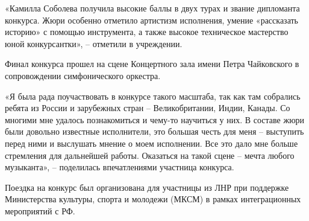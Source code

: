 «Камилла Соболева получила высокие баллы в двух турах и звание дипломанта
конкурса. Жюри особенно отметило артистизм исполнения, умение «рассказать
историю» с помощью инструмента, а также высокое техническое мастерство юной
конкурсантки», – отметили в учреждении. 

Финал конкурса прошел на сцене Концертного зала имени Петра Чайковского в
сопровождении симфонического оркестра. 

«Я была рада поучаствовать в конкурсе такого масштаба, так как там собрались
ребята из России и зарубежных стран – Великобритании, Индии, Канады. Со многими
мне удалось познакомиться и чему-то научиться у них. В составе жюри были
довольно известные исполнители, это большая честь для меня – выступить перед
ними и выслушать мнение о моем исполнении. Все это дало мне больше стремления
для дальнейшей работы. Оказаться на такой сцене – мечта любого музыканта», –
поделилась впечатлениями участница конкурса. 

Поездка на конкурс был организована для участницы из ЛНР при поддержке
Министерства культуры, спорта и молодежи (МКСМ) в рамках интеграционных
мероприятий с РФ.
